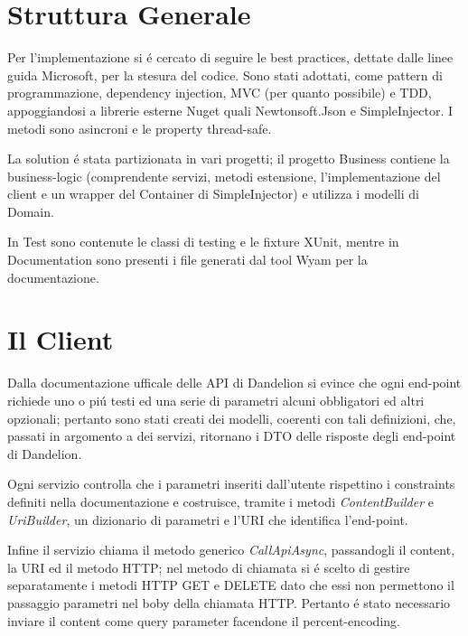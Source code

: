 \section{Struttura Generale}

Per l'implementazione si \'e cercato di seguire le best practices, dettate dalle linee guida Microsoft, per la stesura del codice.
Sono stati adottati, come pattern di programmazione, dependency injection, MVC (per quanto possibile) e TDD, appoggiandosi a librerie esterne Nuget quali 
Newtonsoft.Json e SimpleInjector. I metodi sono asincroni e le property thread-safe.

La solution \'e stata partizionata in vari progetti; il progetto Business contiene la business-logic 
(comprendente servizi, metodi estensione, l'implementazione del client e un wrapper del Container di SimpleInjector) e utilizza i modelli di Domain.

In Test sono contenute le classi di testing e le fixture XUnit, mentre in Documentation sono presenti i file generati dal tool Wyam per la documentazione.

\section{Il Client}

Dalla documentazione ufficale delle API di Dandelion si evince che ogni end-point richiede uno o pi\'u testi ed una serie di parametri alcuni obbligatori ed altri 
opzionali; 
pertanto sono stati creati dei modelli, coerenti con tali definizioni, che, passati in argomento a dei servizi, ritornano i DTO delle risposte degli end-point di Dandelion.

Ogni servizio controlla che i parametri inseriti dall'utente rispettino i constraints definiti nella documentazione e costruisce, tramite i metodi \textit{ContentBuilder} e  
\textit{UriBuilder}, un dizionario di parametri e l'URI che identifica l'end-point. 

Infine il servizio chiama il metodo generico \textit{CallApiAsync}, passandogli il content, la URI ed il metodo HTTP; 
nel metodo di chiamata si \'e scelto di gestire separatamente i metodi HTTP GET e DELETE dato che essi non permettono il passaggio parametri nel boby 
della chiamata HTTP. Pertanto \'e stato necessario inviare il content come query parameter facendone il percent-encoding.


